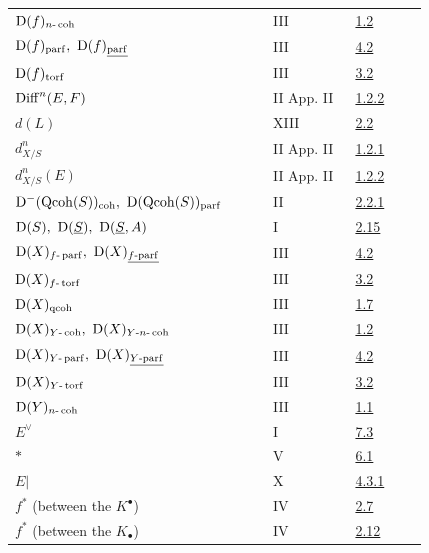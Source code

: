 \begin{longtable}{@{}>{\raggedright\arraybackslash}p{0.50\linewidth}>{\raggedright\arraybackslash}p{0.17\linewidth}>{\raggedright\arraybackslash}p{0.15\linewidth}@{}}
\(\mathrm D(f)_{n\text{-}\operatorname{coh}}\) & III & \hyperlink{sga6.e03.def.1-2}{1.2}\\
\(\Dcat(f)_{\parf},\ \Dcat(f)_{\underline{\mathrm{parf}}}\) & III & \hyperlink{sga6.e03.notation.4-2}{4.2}\\
\(\mathrm D(f)_{\operatorname{torf}}\) & III & \hyperlink{sga6.e03.notation.3-2}{3.2}\\
\(\operatorname{Diff}^n(E,F)\) & II App. II & \hyperlink{sga6.e02.para.1-2-2}{1.2.2}\\
\(d(L)\) & XIII & \hyperlink{sga6.e13.para.2-2}{2.2}\\
\(d^n_{X/S}\) & II App. II & \hyperlink{sga6.e02.para.1-2-1}{1.2.1}\\
\(d^n_{X/S}(E)\) & II App. II & \hyperlink{sga6.e02.para.1-2-2}{1.2.2}\\
\(\Dcat^{-}(\Qcoh(S))_{\coh},\ \Dcat(\Qcoh(S))_{\parf}\) & II & \hyperlink{sga6.e02.notation.2-2-1}{2.2.1}\\
\(\Dcat(S),\ \Dcat(\underline S),\ \Dcat(\underline S,A)\) & I & \hyperlink{sga6.e01.ex.2-15}{2.15}\\
\(\Dcat(X)_{f\text{-}\parf},\ \Dcat(X)_{\underline{f\text{-}\mathrm{parf}}}\) & III & \hyperlink{sga6.e03.notation.4-2}{4.2}\\
\(\mathrm D(X)_{f\text{-}\operatorname{torf}}\) & III & \hyperlink{sga6.e03.notation.3-2}{3.2}\\
\(\mathrm D(X)_{\operatorname{qcoh}}\) & III & \hyperlink{sga6.e03.lem.1-7}{1.7}\\
\(\Dcat(X)_{Y\text{-}\coh},\ \Dcat(X)_{Y\text{-}n\text{-}\coh}\) & III & \hyperlink{sga6.e03.def.1-2}{1.2}\\
\(\Dcat(X)_{Y\text{-}\parf},\ \Dcat(X)_{\underline{Y\text{-}\mathrm{parf}}}\) & III & \hyperlink{sga6.e03.notation.4-2}{4.2}\\
\(\mathrm D(X)_{Y\text{-}\operatorname{torf}}\) & III & \hyperlink{sga6.e03.notation.3-2}{3.2}\\
\(\mathrm D(Y)_{n\text{-}\operatorname{coh}}\) & III & \hyperlink{sga6.e03.thm.1-1}{1.1}\\
\(E^\vee\) & I & \hyperlink{sga6.e01.def.7-3}{7.3}\\
\(*\) & V & \hyperlink{sga6.e05.para.6-1}{6.1}\\
\(E|\) & X & \hyperlink{sga6.e10.prop.4-3-1}{4.3.1}\\
\(f^*\) (between the \(K^\bullet\)) & IV & \hyperlink{sga6.e04.para.2-7}{2.7}\\
\(f^*\) (between the \(K_\bullet\)) & IV & \hyperlink{sga6.e04.para.2-12}{2.12}\\

\end{longtable}
